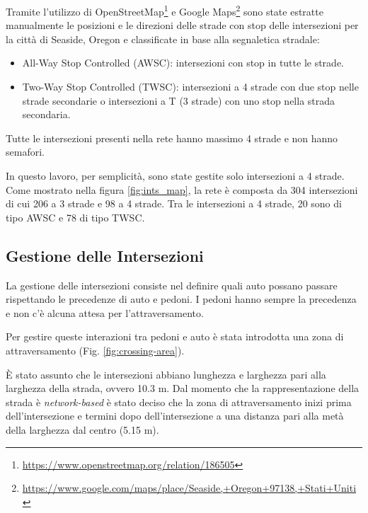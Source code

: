 Tramite l'utilizzo di OpenStreetMap\footnote{\url{https://www.openstreetmap.org/relation/186505}} e Google Maps\footnote{\url{https://www.google.com/maps/place/Seaside,+Oregon+97138,+Stati+Uniti}} sono state estratte manualmente le posizioni e le direzioni delle strade con stop
delle intersezioni per la città di Seaside, Oregon e classificate in base alla segnaletica stradale:

\begin{itemize}
    \item All-Way Stop Controlled (AWSC): intersezioni con stop in tutte le strade.
    \item Two-Way Stop Controlled (TWSC): intersezioni a 4 strade con due stop nelle strade secondarie o intersezioni a T (3 strade) con uno stop nella strada secondaria.
\end{itemize}
Tutte le intersezioni presenti nella rete hanno massimo 4 strade e non hanno semafori.

In questo lavoro, per semplicità, sono state gestite solo intersezioni a 4 strade.
Come mostrato nella figura \ref{fig:ints_map}, la rete è composta da 304 intersezioni
di cui 206 a 3 strade e 98 a 4 strade. Tra le intersezioni a 4 strade, 20 sono di tipo AWSC e 78 di tipo TWSC.

\subsection{Gestione delle Intersezioni}
La gestione delle intersezioni consiste nel definire quali auto possano passare rispettando le precedenze di auto e pedoni.
I pedoni hanno sempre la precedenza e non c'è alcuna attesa per l'attraversamento.

Per gestire queste interazioni tra pedoni e auto è stata introdotta una zona di attraversamento (Fig. \ref{fig:crossing-area}).


È stato assunto che le intersezioni abbiano lunghezza e larghezza pari alla larghezza della strada, ovvero 10.3 m.
Dal momento che la rappresentazione della strada è \textit{network-based} è stato deciso che
la zona di attraversamento inizi prima dell'intersezione e termini dopo dell'intersezione a una distanza pari alla metà della larghezza dal centro (5.15 m).

